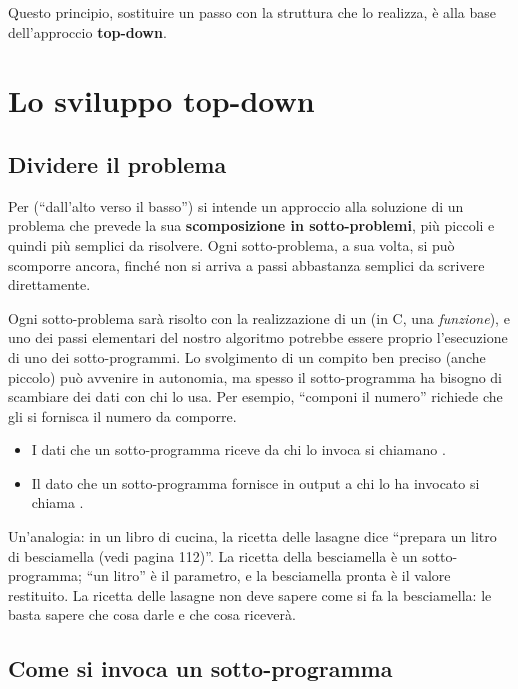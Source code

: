 Questo principio, sostituire un passo con la struttura che lo realizza, è
alla base dell'approccio \textbf{top-down}.

\section{Lo sviluppo top-down}

\subsection{Dividere il problema}

Per  (“dall'alto verso il basso”) si intende un
approccio alla soluzione di un problema che prevede la sua
\textbf{scomposizione in sotto-problemi}, più piccoli e quindi più semplici
da risolvere. Ogni sotto-problema, a sua volta, si può scomporre ancora,
finché non si arriva a passi abbastanza semplici da scrivere direttamente.

Ogni sotto-problema sarà risolto con la realizzazione di un
 (in C, una \textit{funzione}), e uno dei passi
elementari del nostro algoritmo potrebbe essere proprio l'esecuzione di
uno dei sotto-programmi. Lo svolgimento di un compito ben preciso (anche
piccolo) può avvenire in autonomia, ma spesso il sotto-programma ha bisogno
di scambiare dei dati con chi lo usa. Per esempio, “componi il numero”
richiede che gli si fornisca il numero da comporre.

\begin{itemize}
  \item I dati che un sotto-programma riceve da chi lo invoca si chiamano
        .
  \item Il dato che un sotto-programma fornisce in output a chi lo ha
        invocato si chiama .
\end{itemize}

Un'analogia: in un libro di cucina, la ricetta delle lasagne dice
“prepara un litro di besciamella (vedi pagina 112)”. La ricetta della
besciamella è un sotto-programma; “un litro” è il parametro, e la
besciamella pronta è il valore restituito. La ricetta delle lasagne non deve
sapere come si fa la besciamella: le basta sapere che cosa darle e che cosa
riceverà.

\subsection{Come si invoca un sotto-programma}


